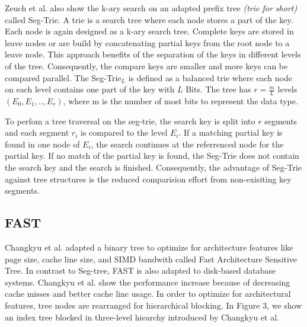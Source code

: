 \documentclass[conference]{IEEEtran}
\begin{document}
Zeuch et al. also show the k-ary search on an adapted prefix tree \emph{(trie for short)} called Seg-Trie. A trie is a search tree where each node stores a part of the key. Each node is again designed as a k-ary search tree. Complete keys are stored in leave nodes or are build by concatenating partial keys from the root node to a leave node. This approach benefits of the separation of the keys in different levels of the tree. Consequently, the compare keys are smaller and more keys can be compared parallel. The Seg-Trie$_L$ is defined as a balanced trie where each node on each level contains one part of the key with $L$ Bits. The tree has $r = \frac{m}{L}$ levels $(E_0, E_1, .., E_r)$, where m is the number of most bits to represent the data type.

To perfom a tree traversal on the seg-trie, the search key is split into $r$ segments and each segment $r_i$ is compared to the level $E_i$. If a matching partial key is found in one node of $E_i$, the search continues at the referrenced node for the partial key. If no match of the partial key is found, the Seg-Trie does not contain the search key and the search is finished. Consequently, the advantage of Seg-Trie against tree structures is the reduced comparision effort from non-exisiting key segments. 


\subsection{FAST}\label{SCM}
Changkyu et al. adapted a binary tree to optimize for architecture features like page size, cache line size, and SIMD bandwith called Fast Architecture Sensitive Tree. In contrast to Seg-tree, FAST is also adapted to disk-based database systems. Changkyu et al. show the performance increase because of decreasing cache misses and better cache line usage. In order to optimize for architectural features, tree nodes are rearranged for hierarchical blocking. In Figure 3, we show an index tree blocked in three-level hiearchy introduced by Changkyu et al. 
\end{document}

